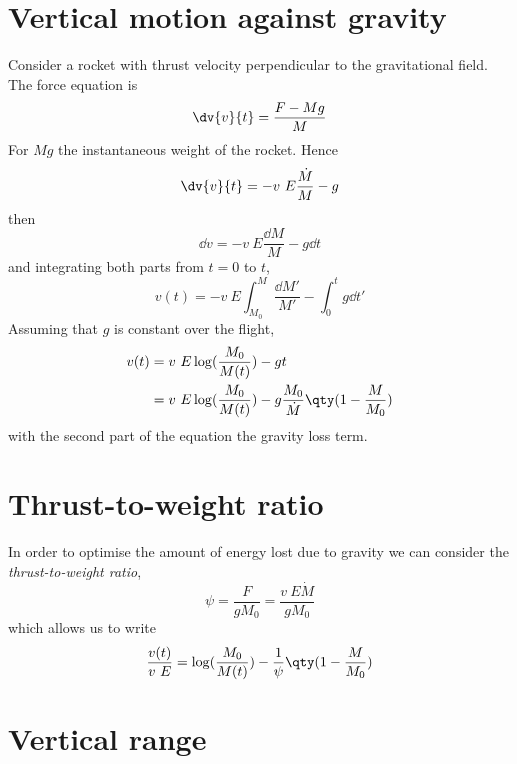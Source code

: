 
\section{Vertical motion against gravity}
\label{sec:vert-moti-against}

Consider a rocket with thrust velocity perpendicular to the
gravitational field. The force equation  is
\begin{equation}
  \label{eq:1}
  \dv{v}{t}= \frac{F-Mg}{M}
\end{equation}
For $Mg$ the instantaneous weight of the rocket. Hence
\begin{equation*}
  \label{eq:2}
  \dv{v}{t} = -v~E \frac{\dot{M}}{M}-g
\end{equation*}
then
\begin{equation*}
  \dd{v} = - v~E \frac{\dd{M}}{M} - g \dd{t}
\end{equation*}
and integrating both parts from $t=0$ to $t$,
\begin{equation*}
  v(t) = - v~E \int_{M_0}^M \frac{\dd{M'}}{M'} - \int_0^t g \dd{t'}
\end{equation*}
Assuming that $g$ is constant over the flight,
\begin{align*}
  v(t) &= v~E \log( \frac{M_0}{M(t)} )-gt \\
&= v~E \log(\frac{M_0}{M(t)}) - g \frac{M_0}{\dot{M}} \qty( 1 - \frac{M}{M_0})
\end{align*}
with the second part of the equation the gravity loss term.

\section{Thrust-to-weight ratio}
\label{sec:ttw-ratio}

In order to optimise the amount of energy lost due to gravity we can
consider the \emph{thrust-to-weight ratio}, 
\begin{equation}
  \label{eq:3}
  \psi = \frac{F}{g M_0} = \frac{v~E \dot{M}}{g M_0}
\end{equation}
which allows us to write
\begin{equation}
  \label{eq:4}
  \frac{v(t)}{v~E} = \log( \frac{M_0}{M(t)} ) - \frac{1}{\psi} \qty( 1 - \frac{M}{M_0} )
\end{equation}

\section{Vertical range}
\label{sec:vertical-range}

